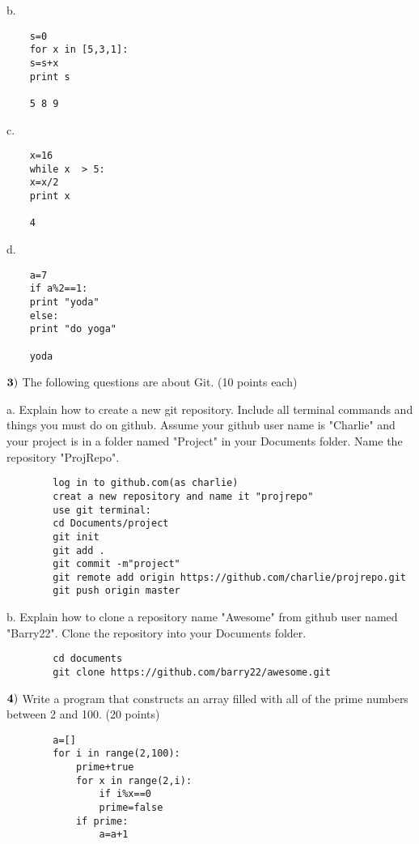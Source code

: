 \documentclass{article}
\begin{document}
	b.  \begin{verbatim}
	s=0
	for x in [5,3,1]:
	s=s+x
	print s
	
	5 8 9
	\end{verbatim}
	\vspace{1cm}
	
	c.  \begin{verbatim}
	x=16
	while x  > 5:
	x=x/2
	print x
	
	4
	\end{verbatim}
	\vspace{1cm}
	
	d.   \begin{verbatim}
	a=7
	if a%2==1:
	print "yoda"
	else:
	print "do yoga"
	
	yoda
	\end{verbatim}
	\vspace{1cm}
	\newpage
	
	
	$\bf{3)}$  The following questions are about Git. (10 points each)
	\vspace{0.5cm}
	
	a.  Explain how to create a new git repository.  Include all terminal commands and things you must do on github.  Assume your github user name is "Charlie" and your project is in a folder named "Project" in your Documents folder.  Name the repository "ProjRepo".
		\begin{verbatim}
		log in to github.com(as charlie)
		creat a new repository and name it "projrepo"
		use git terminal:
		cd Documents/project
		git init
		git add .
		git commit -m"project"
		git remote add origin https://github.com/charlie/projrepo.git
		git push origin master
		\end{verbatim}
		\vspace{1cm}
	b.  Explain how to clone a repository name "Awesome" from github user named "Barry22".  Clone the repository into your Documents folder.
		\begin{verbatim}
		cd documents
		git clone https://github.com/barry22/awesome.git
		\end{verbatim}
		\vspace{1cm}
	\newpage
	
	$\bf{4)}$ Write a program that constructs an array filled with all of the prime numbers between 2 and 100. (20 points)
	\vspace{0.5cm}
	
	\begin{verbatim}
		a=[]
		for i in range(2,100):
			prime+true
			for x in range(2,i):
				if i%x==0
				prime=false
			if prime:
				a=a+1
	\end{verbatim}
	\vspace{1cm}
	
	
	
	
\end{document}
